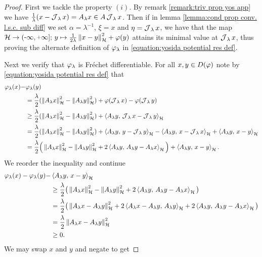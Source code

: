 \begin{proof}
	First we tackle the property $ (i) $.
	By remark \ref{remark:triv prop yos app} we have 
	$ \frac{1}{\lambda}(x-\operatorname{\mathcal{J}}_\lambda x)=A_\lambda x\in A\operatorname{\mathcal{J}}_\lambda x$.
	Then if in lemma \ref{lemma:cond prop conv. l.s.c. sub diff}
	we set $ \alpha=\lambda^{-1} $, $ \xi=x$ and $\eta=\operatorname{\mathcal{J}}_\lambda x $, 
	we have that 
	the map $ \rH\ra\eRR;\,y \mapsto  \frac{1}{2\lambda}\norm{x-y}^2+\vp(y)$
	attains its minimal value at $\operatorname{\mathcal{J}}_\lambda x$, 
	thus proving the alternate definition of $ \varphi_\lambda $
	in \eqref{equation:yosida potential res def}.\smallskip
	
	Next we verify that $ \varphi_\lambda $ is Fréchet differentiable. For all
	$ x,y\in D(\varphi) $ note by \eqref{equation:yosida potential res def} that
	\begin{align*}
		\varphi_\lambda(x)-&\varphi_\lambda(y)\\
		&=\frac{\lambda}{2}(\left\Vert A_\lambda x\right\Vert_{\mathcal{H}}^2-\left\Vert A_\lambda y\right\Vert_{\mathcal{H}}^2)+\varphi(\operatorname{\mathcal{J}}_\lambda x)-\varphi(\operatorname{\mathcal{J}}_\lambda y)\\
		&\geq \frac{\lambda}{2}(\left\Vert A_\lambda x\right\Vert_{\mathcal{H}}^2-\left\Vert A_\lambda y\right\Vert_{\mathcal{H}}^2)+\left\langle A_\lambda y,\,\operatorname{\mathcal{J}}_\lambda x-\operatorname{\mathcal{J}}_\lambda y\right\rangle_{\mathcal{H}}\\
		&=\frac{\lambda}{2}(\left\Vert A_\lambda x\right\Vert_{\mathcal{H}}^2-\left\Vert A_\lambda 
		y\right\Vert_{\mathcal{H}}^2)
		+\left\langle A_\lambda y,\,y-\operatorname{\mathcal{J}}_\lambda y\right\rangle_{\mathcal{H}}
		-\left\langle A_\lambda y,\,x-\operatorname{\mathcal{J}}_\lambda x\right\rangle_{\mathcal{H}}
		+\left\langle A_\lambda y,\,x-y\right\rangle_{\mathcal{H}}\\
		&=\frac{\lambda}{2}\Big(\left\Vert A_\lambda x\right\Vert_{\mathcal{H}}^2-\left\Vert A_\lambda 
			y\right\Vert_{\mathcal{H}}^2+2\left\langle A_\lambda y,\,A_\lambda y-A_\lambda x\right\rangle_{\mathcal{H}}\Big)
		+\left\langle A_\lambda y,\,x-y\right\rangle_{\mathcal{H}}.
	\end{align*}
	We reorder the inequality and continue
	\begin{align}\label{eq1:proposition:yosida approx of prop lsc conv}
		\begin{split}
			\varphi_\lambda(x)-\varphi_\lambda(y)-&\left\langle A_\lambda y,\,x-y\right\rangle_{\mathcal{H}}\\
			&\geq \frac{\lambda}{2}\big(\left\Vert A_\lambda x\right\Vert_{\mathcal{H}}^2-\left\Vert A_\lambda 
				y\right\Vert_{\mathcal{H}}^2+2\left\langle A_\lambda y,\,A_\lambda y-A_\lambda x\right\rangle_{\mathcal{H}}\big)\\
			&=\frac{\lambda}{2}\big(\left\Vert A_\lambda x-A_\lambda y\right\Vert_{\mathcal{H}}^2
			+2\left\langle A_\lambda x-A_\lambda y,\,A_\lambda y\right\rangle_{\mathcal{H}}
			+2\left\langle A_\lambda y,\,A_\lambda y-A_\lambda x\right\rangle_{\mathcal{H}}\big)\\
			&=\frac{\lambda}{2}\left\Vert A_\lambda x-A_\lambda y\right\Vert_{\mathcal{H}}^2\\
			&\geq 0.
		\end{split}
	\end{align} 
	We may swap $x$ and $y$ and negate to get 

\end{proof}
